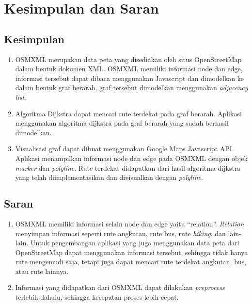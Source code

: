 \chapter{Kesimpulan dan Saran}
\section{Kesimpulan}
\begin{enumerate}
  \item OSMXML merupakan data peta yang disediakan oleh situs
  OpenStreetMap dalam bentuk dokumen XML. OSMXML memiliki informasi node dan
  edge, informasi tersebut dapat dibaca menggunakan Javascript dan dimodelkan 
  ke dalam bentuk graf berarah, graf tersebut dimodelkan menggunakan
  \textit{adjacency list}.
  
  \item Algoritma Dijkstra dapat mencari rute terdekat pada graf berarah.
  Aplikasi menggunakan algoritma dijkstra pada graf berarah yang sudah berhasil
  dimodelkan.
  
  \item Visualisasi graf dapat dibuat menggunakan Google Maps Javascript API.
  Aplikasi menampilkan informasi node dan edge pada OSMXML dengan objek
  \textit{marker} dan \textit{polyline}. Rute terdekat didapatkan dari hasil
  algoritma dijkstra yang telah diimplementasikan dan divisualkan dengan
  \textit{polyline}.
\end{enumerate}

\section{Saran}
\begin{enumerate}
\item OSMXML memiliki informasi selain node dan edge yaitu ``relation''.
\textit{Relation} menyimpan informasi seperti rute angkutan, rute bus, rute
\textit{hiking}, dan lain-lain. Untuk pengembangan aplikasi yang juga
menggunakan data peta dari OpenStreetMap dapat menggunakan informasi tersebut,
sehingga tidak hanya rute mengemudi saja, tetapi juga dapat mencari rute
terdekat angkutan, bus, atau rute lainnya.

\item Informasi yang didapatkan dari OSMXML dapat dilakukan \textit{preprocess}
terlebih dahulu, sehingga kecepatan proses lebih cepat.
\end{enumerate}